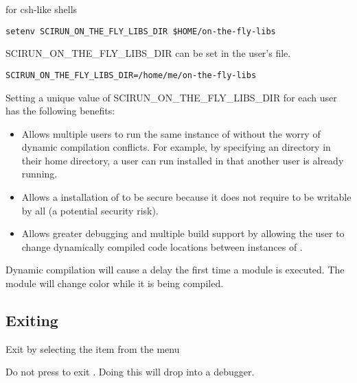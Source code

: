 for csh-like shells

\begin{verbatim}
setenv SCIRUN_ON_THE_FLY_LIBS_DIR $HOME/on-the-fly-libs
\end{verbatim}

SCIRUN\_ON\_THE\_FLY\_LIBS\_DIR can be set in the user's
 file.

\begin{verbatim}
SCIRUN_ON_THE_FLY_LIBS_DIR=/home/me/on-the-fly-libs
\end{verbatim}

Setting a unique value of SCIRUN\_ON\_THE\_FLY\_LIBS\_DIR for each
\sr{} user has the following benefits:

\begin{itemize}
\item Allows multiple users to run the same instance of \sr{} without the worry of  dynamic compilation conflicts.
  For example, by specifying an 
  directory in their home directory, a user can run 
  \sr{} installed in  that another user
  is already running.

\item Allows a  installation of \sr{}
  to be secure because it does not require
   to be writable by
  all (a potential security risk).

\item Allows greater debugging and multiple build support by
  allowing the user to change dynamically compiled code locations
  between instances of \sr{}.

\end{itemize}

Dynamic compilation will cause a delay the first time a module is
executed.  The module will change color while it is being
compiled.

\subsection{Exiting \sr{}}
\label{sec:stopping}

Exit \sr{} by selecting the  item from the  menu

Do not press  to exit \sr{}.  Doing this will drop
\sr{} into a debugger.


